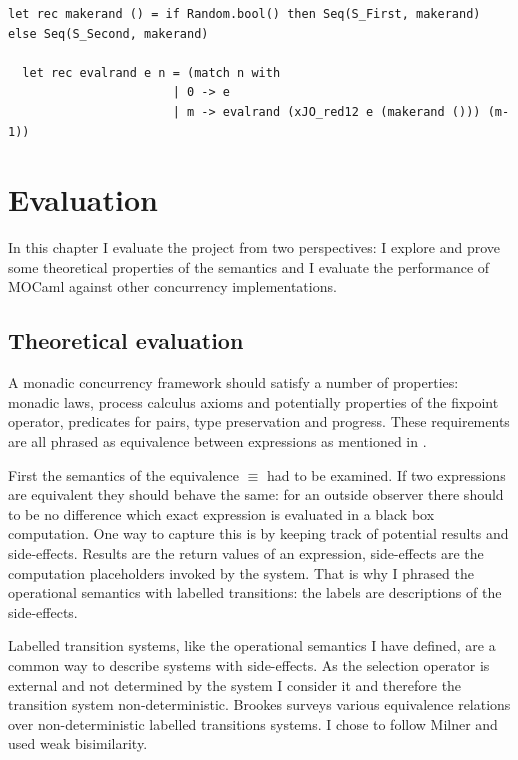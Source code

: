 \documentclass[12pt,twoside,notitlepage]{report}
\theoremstyle{plain}%
\theoremstyle{definition}
\theoremstyle{remark}
\begin{document}
\begin{minipage}{\linewidth}

\begin{lstlisting}[caption={OCaml random scheduler}, label={lst:ocamlrandsched}]
  let rec makerand () = if Random.bool() then Seq(S_First, makerand) else Seq(S_Second, makerand)
  
  let rec evalrand e n = (match n with 
                       | 0 -> e
                       | m -> evalrand (xJO_red12 e (makerand ())) (m-1))
\end{lstlisting}

\end{minipage}


\cleardoublepage
\chapter{Evaluation}
In this chapter I evaluate the project from two perspectives: I explore and prove some theoretical properties of the semantics and I evaluate the performance of MOCaml against other concurrency implementations.


\section{Theoretical evaluation}
\label{sec:behave_equiv}
A monadic concurrency framework should satisfy a number of properties: monadic laws, process calculus axioms and potentially properties of the fixpoint operator, predicates for pairs, type preservation and progress. These requirements are all phrased as equivalence between expressions as mentioned in . 

First the semantics of the equivalence $ \equiv $ had to be examined. If two expressions are equivalent they should behave the same: for an outside observer there should to be no difference which exact expression is evaluated in a black box computation. One way to capture this is by keeping track of potential results and side-effects. Results are the return values of an expression, side-effects are the computation placeholders invoked by the system. That is why I phrased the operational semantics with labelled transitions: the labels are descriptions of the side-effects.

Labelled transition systems, like the operational semantics I have defined, are a common way to describe systems with side-effects. As the selection operator is external and not determined by the system I consider it and therefore the transition system non-deterministic. Brookes\cite{brookes1983behavioural} surveys various equivalence relations over non-deterministic labelled transitions systems. I chose to follow Milner\cite{milner1982calculus} and used weak bisimilarity.
\end{document}
